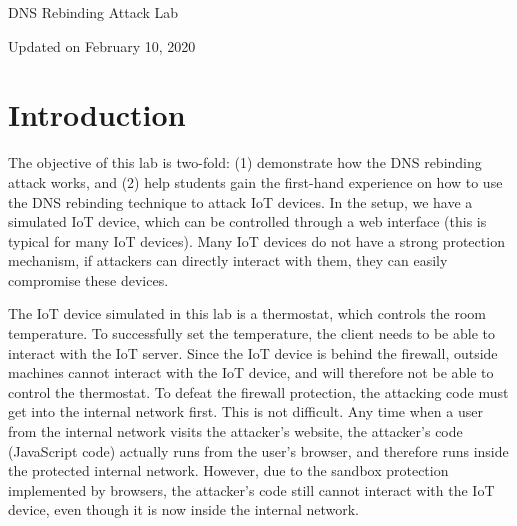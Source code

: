 


\newcommand{\rebindingFigs}{./Figs}





\begin{center}
{\LARGE DNS Rebinding Attack Lab}

\vspace{0.05in}
Updated on February 10, 2020
\end{center}



\setcounter{task}{1}
\newcommand{\tasks} {\bf {\noindent (\arabic{task})} \addtocounter{task}{1} \,}



\section{Introduction}


The objective of this lab is two-fold: (1) demonstrate how 
the DNS rebinding attack works, and (2) help students gain
the first-hand experience on how to use the DNS rebinding
technique to attack IoT devices. In the setup, we have a simulated IoT device, 
which can be controlled through
a web interface (this is typical for many IoT devices). Many IoT devices do not have 
a strong protection mechanism, if attackers can directly interact with them, they can
easily compromise these devices. 


The IoT device simulated in this lab is a thermostat, 
which controls the room temperature. 
To successfully set the temperature, the client needs to be able to interact with the
IoT server. Since the IoT device is behind the firewall, outside machines
cannot interact with the IoT device, and will therefore not be able to 
control the thermostat. To defeat the firewall protection, the attacking code must get into the 
internal network first. This is not difficult. Any time when a user from 
the internal network visits the attacker's website, the attacker's code (JavaScript
code) actually runs from the user's browser, and therefore runs inside the 
protected internal network. However, due to the sandbox protection implemented 
by browsers, the attacker's code still cannot interact with the IoT device, even though it 
is now inside the internal network. 


